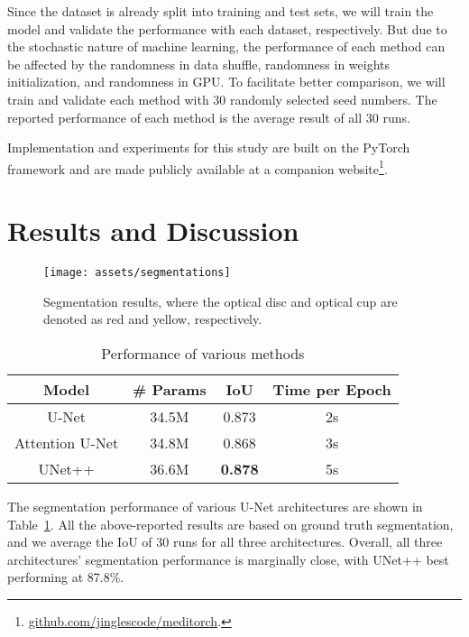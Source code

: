 \documentclass[conference]{IEEEtran}
\begin{document}
Since the dataset is already split into training and test sets, we will train the model and validate the performance with each dataset, respectively. But due to the stochastic nature of machine learning, the performance of each method can be affected by the randomness in data shuffle, randomness in weights initialization, and randomness in GPU. To facilitate better comparison, we will train and validate each method with 30 randomly selected seed numbers. The reported performance of each method is the average result of all 30 runs.

Implementation and experiments for this study are built on the PyTorch framework and are made publicly available at a companion website\footnote{\href{https://github.com/jinglescode/meditorch/blob/master/demo/Drishti-compare-unet-atten_unet-nested_unet-30runs.ipynb}{github.com/jinglescode/meditorch}.}.

\section{Results and Discussion}

\begin{figure*}[ht]
\centerline{\texttt{[image: assets/segmentations]}}
\caption{Segmentation results, where the optical disc and optical cup are denoted as red and yellow, respectively.}
\label{fig_segmentations}
\end{figure*}

\begin{table}[t]
\centering
\caption{Performance of various methods}
\begin{tabular}{||c|c|c|c||}
\hline
\textbf{Model} & \textbf{\# Params} & \textbf{IoU} & \textbf{Time per Epoch} \\
\hline
U-Net & 34.5M & 0.873 & 2s \\
Attention U-Net & 34.8M & 0.868 & 3s \\
UNet++ & 36.6M & \textbf{0.878} & 5s \\
\hline
\end{tabular}
\label{table_results}
\end{table}

The segmentation performance of various U-Net architectures are shown in Table~\ref{table_results}. All the above-reported results are based on ground truth segmentation, and we average the IoU of 30 runs for all three architectures. Overall, all three architectures' segmentation performance is marginally close, with UNet++ best performing at 87.8\%. 
\end{document}
